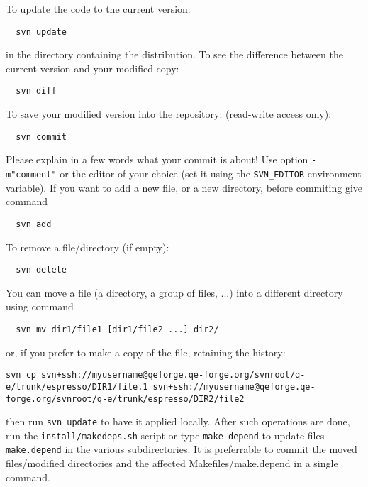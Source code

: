 \documentclass[12pt,a4paper]{article}
\begin{document}
To update the code to the current version:
\begin{verbatim}
  svn update
\end{verbatim}
in the directory containing the distribution.
To see the difference between the current version and your modified
copy:
\begin{verbatim}
  svn diff
\end{verbatim}
To save your modified version into the repository:
(read-write access only):
\begin{verbatim}
  svn commit
\end{verbatim}
Please explain in a few words what your commit is about! Use option
\texttt{-m"comment"} or the editor of your choice (set it using the
\texttt{SVN\_EDITOR} environment variable).
If you want to add a new file, or a new directory, before commiting
give command
\begin{verbatim}
  svn add
\end{verbatim}
To remove a file/directory (if empty):
\begin{verbatim}
  svn delete
\end{verbatim}
You can move a file (a directory, a group of files, ...) into a different
directory using command
\begin{verbatim}
  svn mv dir1/file1 [dir1/file2 ...] dir2/
\end{verbatim}
or, if you prefer to make a copy of the file, retaining the history:
\begin{verbatim}
svn cp svn+ssh://myusername@qeforge.qe-forge.org/svnroot/q-e/trunk/espresso/DIR1/file.1 svn+ssh://myusername@qeforge.qe-forge.org/svnroot/q-e/trunk/espresso/DIR2/file2
\end{verbatim}
then run \texttt{svn update} to have it applied locally.
After such operations are done, run the \texttt{install/makedeps.sh} script
or type \texttt{make depend} to update files \texttt{make.depend} in the
various subdirectories. It is preferrable to commit the moved files/modified
directories and the affected Makefiles/make.depend in a single command.
\end{document}
